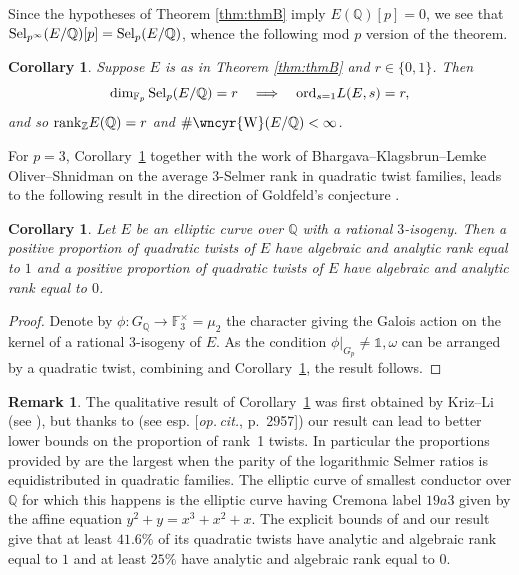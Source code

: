\documentclass[10pt]{amsart}
\newcommand{\sha}{\text{\wncyr{W}}}
\numberwithin{equation}{section}
\newtheorem{cor}[theorem]{Corollary}
\theoremstyle{definition}
\newtheorem{remark}[theorem]{Remark}
\theoremstyle{remark}
\newcommand{\Z}{\mathbb{Z}}
\newcommand{\bQ}{\mathbb{Q}}
\newcommand{\Q}{\mathbb{Q}}
\begin{document}
Since the hypotheses of Theorem \ref{thm:thmB} imply $E(\Q)[p]= 0$, we see that ${\rm Sel}_{p^\infty}(E/\Q)[p]={\rm Sel}_p(E/\Q)$, whence the following mod $p$ version of the theorem.

\begin{cor}\label{cor:thmB} Suppose $E$ is as in Theorem \ref{thm:thmB} and $r\in\{0,1\}$. Then 
\[
\dim_{\mathbb{F}_p}{\rm Sel}_p(E/\Q) = r 
\quad\Longrightarrow\quad
{\rm ord}_{s=1}L(E,s)=r,
\]
and so ${\rm rank}_\Z E(\Q)=r$ and $\#\sha(E/\Q)<\infty$.
\end{cor}

For $p=3$, Corollary~\ref{cor:thmB} together with the work of Bhargava--Klagsbrun--Lemke Oliver--Shnidman \cite{BKLS} on the average $3$-Selmer rank in quadratic twist families, leads to the following result in the direction of Goldfeld's conjecture \cite{goldfeld}. 

\begin{cor}\label{cor:goldfeld}
Let $E$ be an elliptic curve over $\bQ$ with a rational $3$-isogeny. Then %
a positive proportion of quadratic twists of $E$ have algebraic and analytic rank equal to $1$
and a positive proportion of quadratic twists of $E$ have algebraic and analytic rank equal to $0$.
\end{cor}

\begin{proof}
Denote by $\phi:G_\bQ\rightarrow\mathbb{F}_3^\times=\mu_2$ the character giving the Galois action on the kernel of a rational $3$-isogeny of $E$. As the condition $\phi\vert_{G_p}\neq\mathds{1},\omega$ can be arranged by a quadratic twist, combining \cite[Thm.~2.6]{BKLS} and Corollary~\ref{cor:thmB}, the result follows.
\end{proof}

\begin{remark}\label{rem:BKLS}
The qualitative result of Corollary~\ref{cor:goldfeld} was first obtained by Kriz--Li (see \cite[Thm.~1.5]{kriz-li}), but thanks to \cite{BKLS} (see esp. [\emph{op.\,cit.}, p.~2957]) our result {can lead} to better lower bounds on the proportion of rank~1 twists. In particular the proportions provided by \cite[Thm.~2.5]{BKLS} are the largest when the parity of the logarithmic Selmer ratios is equidistributed in quadratic families. The elliptic curve of smallest conductor over $\Q$ for which this happens is the elliptic curve having Cremona label $19a3$ given by the affine equation $y^2+y=x^3+x^2+x$. The explicit bounds of \cite{BKLS} and our result give that at least $41.6\%$ of its quadratic twists have analytic and algebraic rank equal to $1$ and at least $25\%$ have analytic and algebraic rank equal to $0$.
\end{remark}
\end{document}
